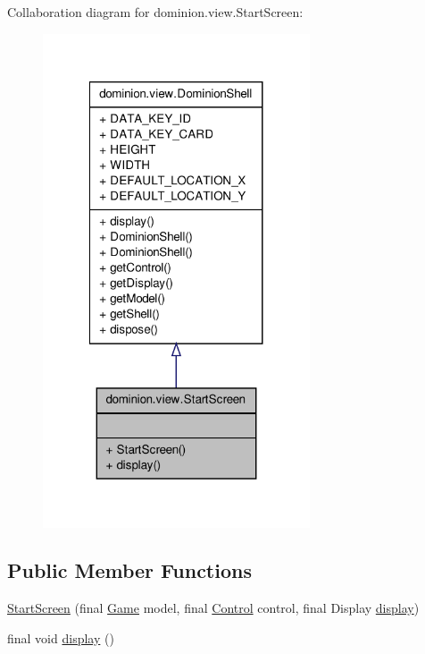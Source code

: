 \-Collaboration diagram for dominion.\-view.\-Start\-Screen\-:
\nopagebreak
\begin{figure}[H]
\begin{center}
\leavevmode
\includegraphics[width=224pt]{classdominion_1_1view_1_1StartScreen__coll__graph}
\end{center}
\end{figure}
\subsection*{\-Public \-Member \-Functions}
\begin{DoxyCompactItemize}
\item 
\hyperlink{classdominion_1_1view_1_1StartScreen_a6f15f4e9c6134779ff9e63cb01cde740}{\-Start\-Screen} (final \hyperlink{interfacedominion_1_1model_1_1Game}{\-Game} model, final \hyperlink{interfacedominion_1_1control_1_1Control}{\-Control} control, final \-Display \hyperlink{classdominion_1_1view_1_1StartScreen_a975ce553e750209f12ac2312be602116}{display})
\item 
final void \hyperlink{classdominion_1_1view_1_1StartScreen_a975ce553e750209f12ac2312be602116}{display} ()
\end{DoxyCompactItemize}


